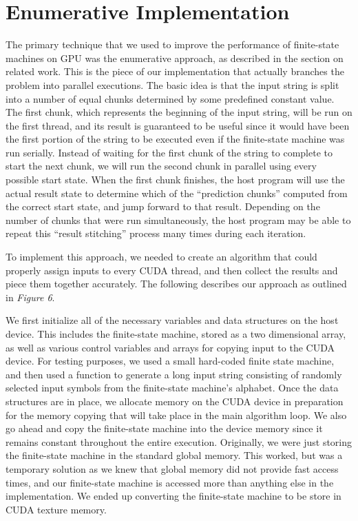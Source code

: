 \documentclass[11pt]{sigplanconf}
\begin{document}
\section{Enumerative Implementation}

The primary technique that we used to improve the performance of finite-state machines on GPU was the enumerative approach, as described in the section on related work. This is the piece of our implementation that actually branches the problem into parallel executions. The basic idea is that the input string is split into a number of equal chunks determined by some predefined constant value. The first chunk, which represents the beginning of the input string, will be run on the first thread, and its result is guaranteed to be useful since it would have been the first portion of the string to be executed even if the finite-state machine was run serially. Instead of waiting for the first chunk of the string to complete to start the next chunk, we will run the second chunk in parallel using every possible start state. When the first chunk finishes, the host program will use the actual result state to determine which of the ``prediction chunks'' computed from the correct start state, and jump forward to that result. Depending on the number of chunks that were run simultaneously, the host program may be able to repeat this ``result stitching'' process many times during each iteration. 

To implement this approach, we needed to create an algorithm that could properly assign inputs to every CUDA thread, and then collect the results and piece them together accurately. The following describes our approach as outlined in \textit{Figure 6}. 

We first initialize all of the necessary variables and data structures on the host device. This includes the finite-state machine, stored as a two dimensional array, as well as various control variables and arrays for copying input to the CUDA device. For testing purposes, we used a small hard-coded finite state machine, and then used a function to generate a long input string consisting of randomly selected input symbols from the finite-state machine's alphabet. Once the data structures are in place, we allocate memory on the CUDA device in preparation for the memory copying that will take place in the main algorithm loop. We also go ahead and copy the finite-state machine into the device memory since it remains constant throughout the entire execution. Originally, we were just storing the finite-state machine in the standard global memory. This worked, but was a temporary solution as we knew that global memory did not provide fast access times, and our finite-state machine is accessed more than anything else in the implementation. We ended up converting the finite-state machine to be store in CUDA texture memory. 
\end{document}
